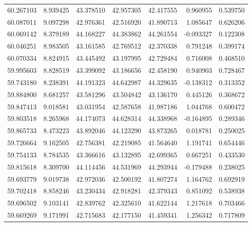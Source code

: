 \begin{tabular}{rrrrrrr}
 60.267103 &   8.939425 &         43.378510 &         42.957305 &         42.417555 &  0.960955 &  0.539750 \\
 60.087011 &   9.097298 &         42.976361 &         42.516920 &         41.890713 &  1.085647 &  0.626206 \\
 60.069142 &   8.379189 &         44.168227 &         44.383862 &         44.261554 & -0.093327 &  0.122308 \\
 60.046251 &   8.983505 &         43.161585 &         42.769512 &         42.370338 &  0.791248 &  0.399174 \\
 60.070334 &   8.824915 &         43.445492 &         43.197995 &         42.729484 &  0.716008 &  0.468510 \\
 59.995603 &   8.828519 &         43.399092 &         43.186656 &         42.458190 &  0.940903 &  0.728467 \\
 59.743180 &   8.238391 &         44.191323 &         44.642987 &         44.329635 & -0.138312 &  0.313352 \\
 59.884800 &   8.681257 &         43.581296 &         43.504842 &         43.136170 &  0.445126 &  0.368672 \\
 59.847413 &   9.018581 &         43.031954 &         42.587658 &         41.987186 &  1.044768 &  0.600472 \\
 59.803518 &   8.265968 &         44.174073 &         44.628314 &         44.338968 & -0.164895 &  0.289346 \\
 59.865733 &   8.473223 &         43.892046 &         44.123290 &         43.873265 &  0.018781 &  0.250025 \\
 59.726664 &   9.162505 &         42.756381 &         42.219085 &         41.564640 &  1.191741 &  0.654446 \\
 59.754133 &   8.784535 &         43.366616 &         43.132895 &         42.699365 &  0.667251 &  0.433530 \\
 59.815618 &   8.309700 &         44.114456 &         44.531969 &         44.293944 & -0.179488 &  0.238025 \\
 59.693779 &   9.019738 &         42.972036 &         42.500192 &         41.807274 &  1.164762 &  0.692919 \\
 59.702418 &   8.858246 &         43.230434 &         42.918281 &         42.379343 &  0.851092 &  0.538938 \\
 59.696502 &   9.103141 &         42.839762 &         42.325610 &         41.622144 &  1.217618 &  0.703466 \\
 59.669269 &   9.171991 &         42.715683 &         42.177150 &         41.459341 &  1.256342 &  0.717809 \\

\end{tabular}

